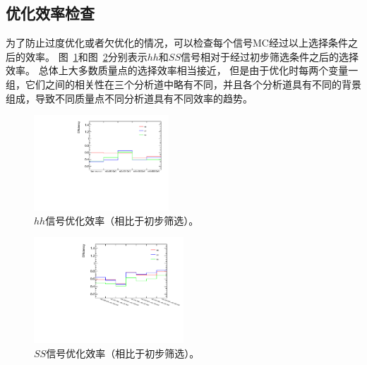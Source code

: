 
 
\clearpage
\subsection{优化效率检查}
为了防止过度优化或者欠优化的情况，可以检查每个信号MC经过以上选择条件之后的效率。
图~\ref {fig:eff_sigopt_hh}和图~\ref {fig:eff_sigopt_SS}分别表示$hh$和$SS$信号相对于经过初步筛选条件之后的选择效率。 总体上大多数质量点的选择效率相当接近，
 但是由于优化时每两个变量一组，它们之间的相关性在三个分析道中略有不同，并且各个分析道具有不同的背景组成，导致不同质量点不同分析道具有不同效率的趋势。
 \begin{figure}[h]
\begin{center}
\includegraphics[width = 0.45\textwidth,angle=-90]{fig/SigOpt/eff_sigopt_hh.pdf}
\caption{$hh$信号优化效率（相比于初步筛选）。}
\label{fig:eff_sigopt_hh}
\end{center}
\end{figure}

\begin{figure}[h]
\begin{center}
\includegraphics[width = 0.50\textwidth,angle=-90]{fig/SigOpt/eff_sigopt_SS.pdf}
\caption{$SS$信号优化效率（相比于初步筛选）。}
\label{fig:eff_sigopt_SS}
\end{center}
\end{figure}

